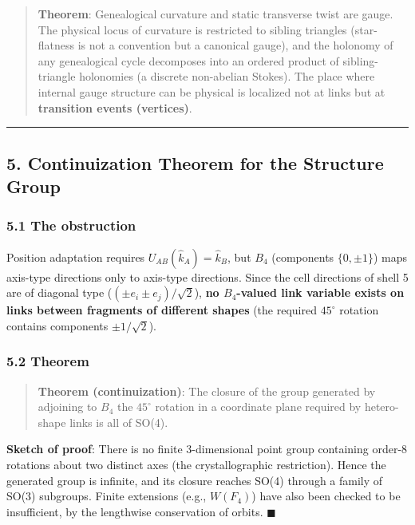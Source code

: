\documentclass[
]{ltjsarticle}
\begin{document}
\begin{quote}
\textbf{Theorem}: Genealogical curvature and static transverse twist are
gauge. The physical locus of curvature is restricted to sibling
triangles (star-flatness is not a convention but a canonical gauge), and
the holonomy of any genealogical cycle decomposes into an ordered
product of sibling-triangle holonomies (a discrete non-abelian Stokes).
The place where internal gauge structure can be physical is localized
not at links but at \textbf{transition events (vertices)}.
\end{quote}

\begin{center}\rule{0.5\linewidth}{0.5pt}\end{center}

\subsection{5. Continuization Theorem for the Structure
Group}\label{continuization-theorem-for-the-structure-group}

\subsubsection{5.1 The obstruction}\label{the-obstruction}

Position adaptation requires \(U_{AB}(\hat k_A)=\hat k_B\), but \(B_4\)
(components \(\{0,\pm1\}\)) maps axis-type directions only to axis-type
directions. Since the cell directions of shell 5 are of diagonal type
(\((\pm e_i\pm e_j)/\sqrt2\)), \textbf{no \(B_4\)-valued link variable
exists on links between fragments of different shapes} (the required
\(45^\circ\) rotation contains components \(\pm1/\sqrt2\)).

\subsubsection{5.2 Theorem}\label{theorem}

\begin{quote}
\textbf{Theorem (continuization)}: The closure of the group generated by
adjoining to \(B_4\) the \(45^\circ\) rotation in a coordinate plane
required by hetero-shape links is all of SO(4).
\end{quote}

\textbf{Sketch of proof}: There is no finite 3-dimensional point group
containing order-8 rotations about two distinct axes (the
crystallographic restriction). Hence the generated group is infinite,
and its closure reaches SO(4) through a family of SO(3) subgroups.
Finite extensions (e.g., \(W(F_4)\)) have also been checked to be
insufficient, by the lengthwise conservation of orbits. \(\blacksquare\)
\end{document}
